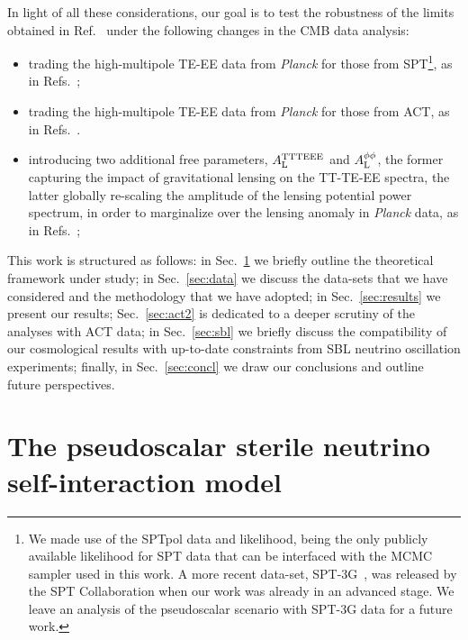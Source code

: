 \documentclass[a4paper,11pt]{article}
\begin{document}
In light of all these considerations, our goal is to test the robustness of the limits obtained in Ref.~\cite{Archidiacono:2020yey} under the following changes in the CMB data analysis:
%
\begin{itemize}
\item trading the high-multipole TE-EE data from {\emph{Planck}} for those from SPT\footnote{We made use of the SPTpol data and likelihood, being the only publicly available likelihood for SPT data that can be interfaced with the MCMC sampler used in this work. A more recent data-set, SPT-3G~\cite{SPT-3G:2021eoc}, was released by the SPT Collaboration when our work was already in an advanced stage. We leave an analysis of the pseudoscalar scenario with SPT-3G data for a future work.}, as in Refs.~\cite{Chudaykin:2020acu,Chudaykin:2020igl,Abellan:2021bpx};
%
\item trading the high-multipole TE-EE data from {\emph{Planck}} for those from ACT, as in Refs.~\cite{Lin:2020jcb,Abellan:2021bpx,Galli:2021mxk,Hill:2021yec,Poulin:2021bjr}.
%
\item introducing two additional free parameters, $A^{\rm TTTEEE}_{\rm L}$ and $A^{\phi\phi}_{\rm L}$, the former capturing the impact of gravitational lensing on the TT-TE-EE spectra, the latter globally re-scaling the amplitude of the lensing potential power spectrum, in order to marginalize over the lensing anomaly in \emph{Planck} data, as in Refs.~\cite{Simard:2017xtw,Wu:2019hek,Murgia:2020ryi,Abellan:2021bpx};
%
\end{itemize}

This work is structured as follows: in Sec.~\ref{sec:model} we briefly outline the theoretical framework under study; in Sec.~\ref{sec:data} we discuss the data-sets that we have considered and the methodology that we have adopted; in Sec.~\ref{sec:results} we present our results; Sec.~\ref{sec:act2} is dedicated to a deeper scrutiny of the analyses with ACT data; in Sec.~\ref{sec:sbl} we briefly discuss the compatibility of our cosmological results with up-to-date constraints from SBL neutrino oscillation experiments; finally, in Sec.~\ref{sec:concl} we draw our conclusions and outline future perspectives.






\section{The pseudoscalar sterile neutrino self-interaction model}\label{sec:model}
\end{document}
